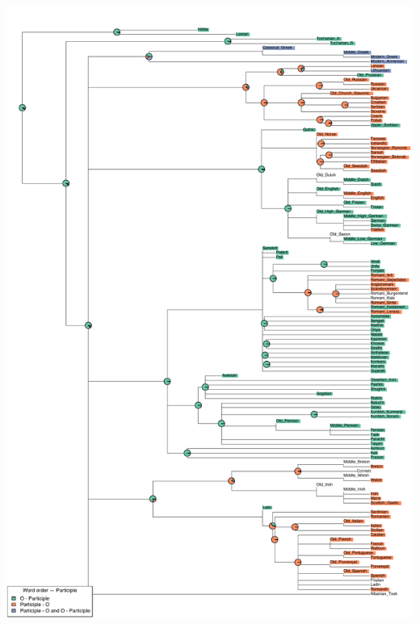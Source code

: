 \includegraphics[width=.9\linewidth]{supp-graphics/WordorderParticipleOVWordorderParticipleVO.pdf}

